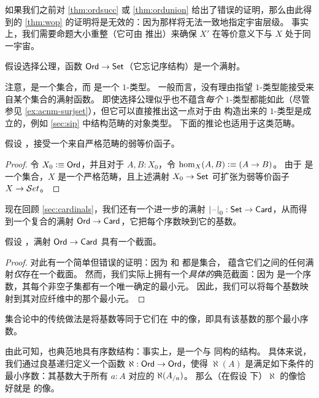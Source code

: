 \begin{rmk}
  如果我们之前对 \cref{thm:ordsucc} 或 \cref{thm:ordunion} 给出了错误的证明，那么由此得到的 \cref{thm:wop} 的证明将是无效的：因为那样将无法一致地指定宇宙层级。
  事实上，我们需要命题大小重整（它可由 \LEM{} 推出）来确保 $X'$ 在等价意义下与 $X$ 处于同一宇宙。
\end{rmk}

\begin{cor}
  假设选择公理，函数 $\mathsf{Ord}\to\mathsf{Set}$（它忘记序结构）是一个满射。
\end{cor}

注意，\ord 是一个集合，而 \set 是一个 $1$-类型。
一般而言，没有理由指望 $1$-类型能接受来自某个集合的满射函数。
即使选择公理似乎也不蕴含\emph{每个} $1$-类型都能如此（尽管参见 \cref{ex:acnm-surjset}），但它可以直接推出这一点对于由 \set 构造出来的 $1$-类型是成立的，例如 \cref{sec:sip} 中结构范畴的对象类型。
下面的推论也适用于这类范畴。

\begin{cor}
  假设 \choice{}，\uset 接受一个来自严格范畴的弱等价函子。
\end{cor}

\begin{proof}
  令 $X_0\vcentcolon\equiv \mathsf{Ord}$，并且对于 $A,B:X_0$，令 $\hom_X(A,B) \vcentcolon\equiv (A\to B)$。
  由于 \ord 是一个集合，$X$ 是一个严格范畴，且上述满射 $X_0 \to \mathsf{Set}$ 可扩张为弱等价函子 $X\to \mathcal{S}et$。
\end{proof}

现在回顾 \cref{sec:cardinals}，我们还有一个进一步的满射 $\mathopen{}\left|\mathord{\hspace{1pt}\text{--}\hspace{1pt}}\right|_{0}^{}\mathclose{}:\mathsf{Set}\to\mathsf{Card}$，从而得到一个复合的满射 $\mathsf{Ord}\to\mathsf{Card}$，它把每个序数映到它的基数。

\begin{thm}
  假设 \choice{}，满射 $\mathsf{Ord}\to\mathsf{Card}$ 具有一个截面。
\end{thm}

\begin{proof}
  对此有一个简单但错误的证明：因为 \ord 和 \card 都是集合，\choice{} 蕴含它们之间的任何满射\emph{仅}存在一个截面。
  然而，我们实际上拥有一个\emph{具体的}典范截面：因为 \ord 是一个序数，其每个非空子集都有一个唯一确定的最小元。
  因此，我们可以将每个基数映射到其对应纤维中的那个最小元。
\end{proof}

集合论中的传统做法是将基数等同于它们在 \ord 中的像，即具有该基数的那个最小序数。

由此可知，\card 也典范地具有序数结构：事实上，是一个与 \ord 同构的结构。
具体来说，我们通过良基递归定义一个函数 $\aleph:\mathsf{Ord}\to\mathsf{Ord}$，使得 $\aleph(A)$ 是满足如下条件的最小序数：其基数大于所有 $a:A$ 对应的 $\aleph({{A}_{/a}})$。
那么（在假设 \choice{} 下）$\aleph$ 的像恰好就是 \card 的像。

